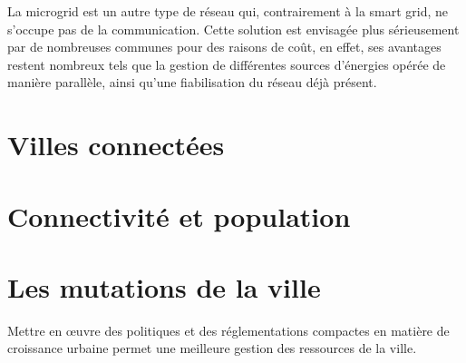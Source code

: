 
La microgrid est un autre type de réseau qui, contrairement à la smart grid, ne s'occupe pas de la communication.
Cette solution est envisagée plus sérieusement par de nombreuses communes pour des raisons de coût, en effet, ses
avantages restent nombreux tels que la gestion de différentes sources d'énergies opérée de manière parallèle,
ainsi qu'une fiabilisation du réseau déjà présent.




\section{Villes connectées}

\section{Connectivité et population}

\section{Les mutations de la ville}

Mettre en œuvre des politiques et des réglementations compactes en matière de croissance urbaine
permet une meilleure gestion des ressources de la ville.

